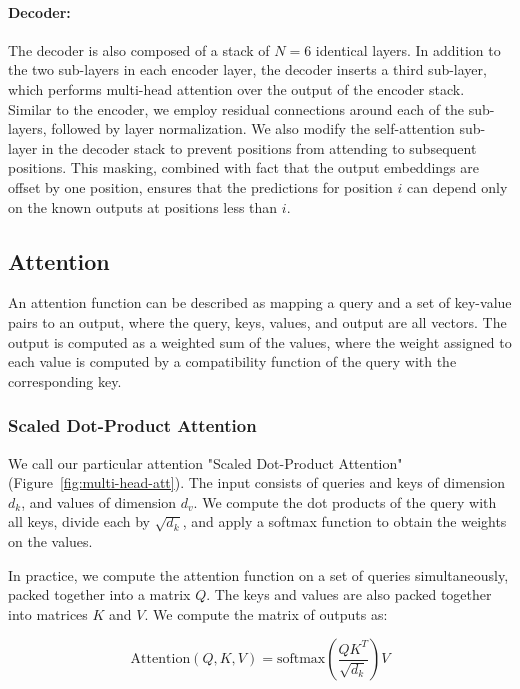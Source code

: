   \paragraph{Decoder:}The decoder is also composed of a stack of $N=6$ identical layers.  In addition to the two sub-layers in each encoder layer, the decoder inserts a third sub-layer, which performs multi-head attention over the output of the encoder stack.  Similar to the encoder, we employ residual connections around each of the sub-layers, followed by layer normalization.  We also modify the self-attention sub-layer in the decoder stack to prevent positions from attending to subsequent positions.  This masking, combined with fact that the output embeddings are offset by one position, ensures that the predictions for position $i$ can depend only on the known outputs at positions less than $i$.

  \subsection{Attention} \label{sec:attention}
  An attention function can be described as mapping a query and a set of key-value pairs to an output, where the query, keys, values, and output are all vectors.  The output is computed as a weighted sum of the values, where the weight assigned to each value is computed by a compatibility function of the query with the corresponding key.

  \subsubsection{Scaled Dot-Product Attention} \label{sec:scaled-dot-prod}

  We call our particular attention "Scaled Dot-Product Attention" (Figure~\ref{fig:multi-head-att}).   The input consists of queries and keys of dimension $d_k$, and values of dimension $d_v$.  We compute the dot products of the query with all keys, divide each by $\sqrt{d_k}$, and apply a softmax function to obtain the weights on the values.

  In practice, we compute the attention function on a set of queries simultaneously, packed together into a matrix $Q$.   The keys and values are also packed together into matrices $K$ and $V$.  We compute the matrix of outputs as:

  \begin{equation}
     \mathrm{Attention}(Q, K, V) = \mathrm{softmax}(\frac{QK^T}{\sqrt{d_k}})V
  \end{equation}

